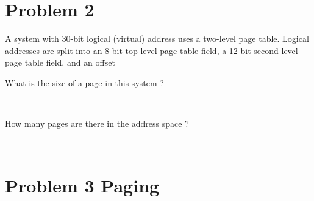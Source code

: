 \documentclass{article}
\begin{document}
\section{Problem 2}
A system with 30-bit logical (virtual) address uses a two-level page table.
Logical addresses are split into an 8-bit top-level page table field, a 12-bit second-level page
table field, and an offset
\begin{description}
    \item[What is the size of a page in this system ?] \hfill \\ 
    \item[How many pages are there in the address space ?] \hfill \\ 
\end{description}

\newpage

\section{Problem 3 Paging}
\end{document}
